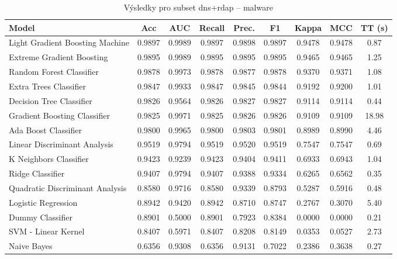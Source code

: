 \begin{table}[H]
  \centering
  \small
  \caption{Výsledky pro subset dns+rdap – malware}
  \begin{tabular}{|l|c|c|c|c|c|c|c|c|}
    \hline
    \textbf{Model} & \textbf{Acc} & \textbf{AUC} & \textbf{Recall} & \textbf{Prec.} & \textbf{F1} & \textbf{Kappa} & \textbf{MCC} & \textbf{TT (s)} \\
    \hline
    Light Gradient Boosting Machine & 0.9897 & 0.9989 & 0.9897 & 0.9898 & 0.9897 & 0.9478 & 0.9478 & 0.87 \\
    Extreme Gradient Boosting & 0.9895 & 0.9989 & 0.9895 & 0.9895 & 0.9895 & 0.9465 & 0.9465 & 1.25 \\
    Random Forest Classifier & 0.9878 & 0.9973 & 0.9878 & 0.9877 & 0.9878 & 0.9370 & 0.9371 & 1.08 \\
    Extra Trees Classifier & 0.9847 & 0.9933 & 0.9847 & 0.9845 & 0.9844 & 0.9192 & 0.9200 & 1.01 \\
    Decision Tree Classifier & 0.9826 & 0.9564 & 0.9826 & 0.9827 & 0.9827 & 0.9114 & 0.9114 & 0.44 \\
    Gradient Boosting Classifier & 0.9825 & 0.9971 & 0.9825 & 0.9826 & 0.9826 & 0.9109 & 0.9109 & 18.98 \\
    Ada Boost Classifier & 0.9800 & 0.9965 & 0.9800 & 0.9803 & 0.9801 & 0.8989 & 0.8990 & 4.46 \\
    Linear Discriminant Analysis & 0.9519 & 0.9794 & 0.9519 & 0.9520 & 0.9519 & 0.7547 & 0.7547 & 0.69 \\
    K Neighbors Classifier & 0.9423 & 0.9239 & 0.9423 & 0.9404 & 0.9411 & 0.6933 & 0.6943 & 1.04 \\
    Ridge Classifier & 0.9407 & 0.9794 & 0.9407 & 0.9388 & 0.9334 & 0.6265 & 0.6562 & 0.35 \\
    Quadratic Discriminant Analysis & 0.8580 & 0.9716 & 0.8580 & 0.9339 & 0.8793 & 0.5287 & 0.5916 & 0.48 \\
    Logistic Regression & 0.8942 & 0.9420 & 0.8942 & 0.8710 & 0.8747 & 0.2767 & 0.3070 & 5.40 \\
    Dummy Classifier & 0.8901 & 0.5000 & 0.8901 & 0.7923 & 0.8384 & 0.0000 & 0.0000 & 0.21 \\
    SVM - Linear Kernel & 0.8407 & 0.5971 & 0.8407 & 0.8208 & 0.8149 & 0.0353 & 0.0527 & 2.73 \\
    Naive Bayes & 0.6356 & 0.9308 & 0.6356 & 0.9131 & 0.7022 & 0.2386 & 0.3638 & 0.27 \\
    \hline
  \end{tabular}
\end{table}
\vspace{0.5cm}


